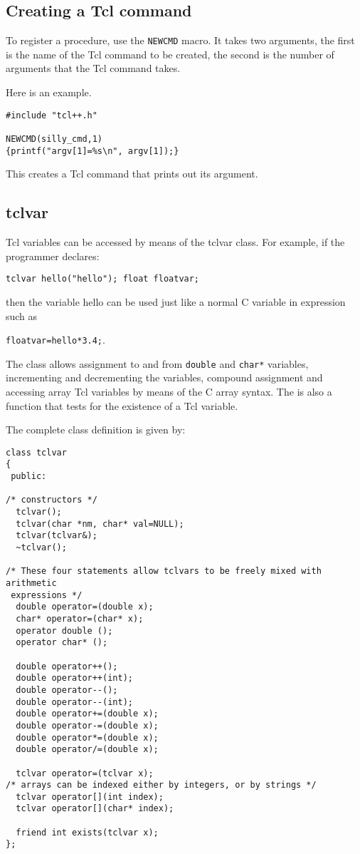 \subsection{Creating a Tcl command}
To register a procedure, use the \verb|NEWCMD| macro. It takes two
arguments, the first is the name of the Tcl command to be created, the
second is the number of arguments that the Tcl command takes.

Here is an example.
\begin{verbatim}
#include "tcl++.h"

NEWCMD(silly_cmd,1)
{printf("argv[1]=%s\n", argv[1]);}
\end{verbatim}
This creates a Tcl command that prints out its argument.

\subsection{tclvar}\label{tclvar}

Tcl variables can be accessed by means of the tclvar class. For
example, if the programmer declares:

\verb|tclvar hello("hello"); float floatvar;|

then the variable hello can be used just like a normal C variable in
expression such as 

\verb|floatvar=hello*3.4;|.

The class allows assignment to and from \verb|double| and \verb|char*|
variables, incrementing and decrementing the variables, compound
assignment and accessing array Tcl variables by means of the C array
syntax. The is also a function that tests for the existence of a Tcl
variable.

The complete class definition is given by:

\begin{verbatim}
class tclvar
{ 
 public:

/* constructors */
  tclvar();
  tclvar(char *nm, char* val=NULL);
  tclvar(tclvar&);
  ~tclvar();

/* These four statements allow tclvars to be freely mixed with arithmetic 
 expressions */
  double operator=(double x);
  char* operator=(char* x);
  operator double ();
  operator char* ();

  double operator++();
  double operator++(int);
  double operator--();
  double operator--(int); 
  double operator+=(double x);
  double operator-=(double x);
  double operator*=(double x);
  double operator/=(double x);

  tclvar operator=(tclvar x); 
/* arrays can be indexed either by integers, or by strings */
  tclvar operator[](int index);
  tclvar operator[](char* index);

  friend int exists(tclvar x);
};
\end{verbatim}

